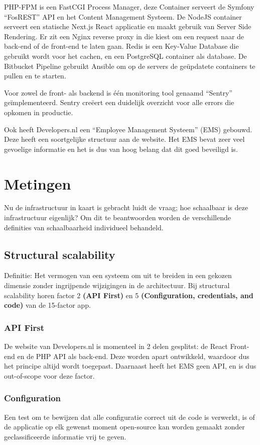 PHP-FPM is een FastCGI Process Manager, deze Container serveert de Symfony “FosREST” API en het Content Management Systeem. De NodeJS container serveert een statische Next.js React applicatie en maakt gebruik van Server Side Rendering. Er zit een Nginx reverse proxy in die kiest om een request naar de back-end of de front-end te laten gaan. Redis is een Key-Value Database die gebruikt wordt voor het cachen, en een PostgreSQL container als database. De Bitbucket Pipeline gebruikt Ansible om op de servers de geüpdatete containers te pullen en te starten.

Voor zowel de front- als backend is één monitoring tool genaamd \enquote{Sentry} geïmplementeerd. Sentry creëert een duidelijk overzicht voor alle errors die opkomen in productie.

Ook heeft Developers.nl een \enquote{Employee Management Systeem} (EMS) gebouwd. Deze heeft een soortgelijke structuur aan de website. Het EMS bevat zeer veel gevoelige informatie en het is dus van hoog belang dat dit goed beveiligd is.

\section{Metingen}

Nu de infrastructuur in kaart is gebracht luidt de vraag; hoe schaalbaar is deze infrastructuur eigenlijk? Om dit te beantwoorden worden de verschillende definities van schaalbaarheid individueel behandeld.

\subsection{Structural scalability}
Definitie: Het vermogen van een systeem om uit te breiden in een gekozen dimensie zonder ingrijpende wijzigingen in de architectuur. Bij structural scalability horen factor 2 \textbf{(API First)} en 5 \textbf{(Configuration, credentials, and code)} van de 15-factor app.

\subsubsection{API First}
De website van Developers.nl is momenteel in 2 delen gesplitst: de React Front-end en de PHP API als back-end. Deze worden apart ontwikkeld, waardoor dus het principe altijd wordt toegepast. Daarnaast heeft het EMS geen API, en is dus out-of-scope voor deze factor.

\subsubsection{Configuration}
Een test om te bewijzen dat alle configuratie correct uit de code is verwerkt, is of de applicatie op elk gewenst moment open-source kan worden gemaakt zonder geclassificeerde informatie vrij te geven.

